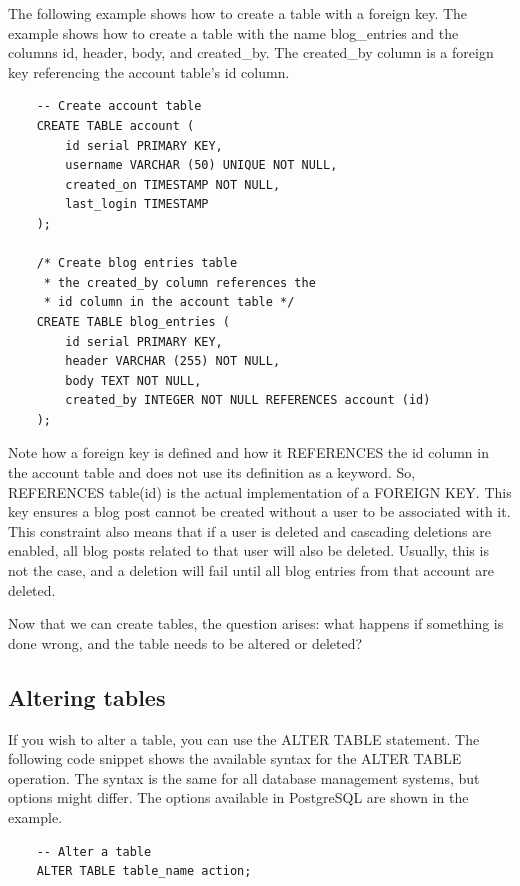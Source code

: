 The following example shows how to create a table with a foreign key. The example shows how to create a table with the name blog\_entries and the columns id, header, body, and created\_by. The created\_by column is a foreign key referencing the account table's id column. 

\begin{verbatim}
    -- Create account table
    CREATE TABLE account (
        id serial PRIMARY KEY,
        username VARCHAR (50) UNIQUE NOT NULL,
        created_on TIMESTAMP NOT NULL, 
        last_login TIMESTAMP
    );
    
    /* Create blog entries table
     * the created_by column references the 
     * id column in the account table */
    CREATE TABLE blog_entries (
        id serial PRIMARY KEY, 
        header VARCHAR (255) NOT NULL,
        body TEXT NOT NULL,
        created_by INTEGER NOT NULL REFERENCES account (id)
    );
\end{verbatim}

Note how a foreign key is defined and how it REFERENCES the id column in the account table and does not use its definition as a keyword. So, REFERENCES table(id) is the actual implementation of a FOREIGN KEY. This key ensures a blog post cannot be created without a user to be associated with it. This constraint also means that if a user is deleted and cascading deletions are enabled, all blog posts related to that user will also be deleted. Usually, this is not the case, and a deletion will fail until all blog entries from that account are deleted.

Now that we can create tables, the question arises: what happens if something is done wrong, and the table needs to be altered or deleted? 

\subsection{Altering tables}
If you wish to alter a table, you can use the ALTER TABLE statement. The following code snippet shows the available syntax for the ALTER TABLE operation. The syntax is the same for all database management systems, but options might differ. The options available in PostgreSQL are shown in the example.

\begin{verbatim}
    -- Alter a table
    ALTER TABLE table_name action;
\end{verbatim}

